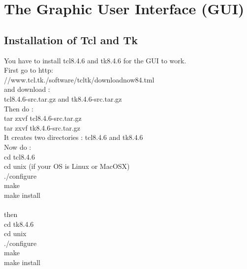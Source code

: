 \documentclass[a4paper]{report}
\begin{document}
\chapter{The Graphic User Interface (GUI)}

\section{Installation of Tcl and Tk}
\huge
You have to install tcl8.4.6 and tk8.4.6 for the GUI to work.\\
First go to http:\\
//www.tcl.tk./software/tcltk/downloadnow84.tml \\
and download :\\
tcl8.4.6-src.tar.gz and tk8.4.6-src.tar.gz\\
Then do :\\
tar zxvf tcl8.4.6-src.tar.gz\\
tar zxvf tk8.4.6-src.tar.gz\\
It creates two directories : tcl8.4.6 and tk8.4.6\\
Now do : \\
cd tcl8.4.6\\
cd unix (if your OS is Linux or MacOSX)\\
./configure\\
make\\
make install\\
\\
then \\
cd tk8.4.6\\
cd unix\\
./configure\\
make\\
make install\\
\end{document}
